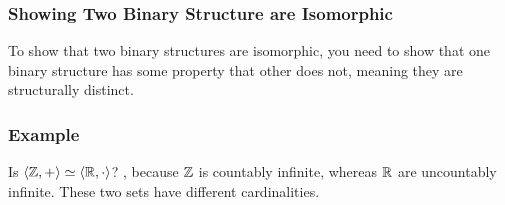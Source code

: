 \subsubsection*{Showing Two Binary Structure are  Isomorphic}
To show that two binary structures are  isomorphic, you need to show that one binary structure has some property that other does not, meaning they are structurally distinct.

\subsubsection*{Example}
Is $\langle \mathbb{Z},+ \rangle \simeq \langle \mathbb{R}, \cdot \rangle$? , because $\mathbb{Z}$ is countably infinite, whereas $\mathbb{R}$ are uncountably infinite. These two sets have different cardinalities.